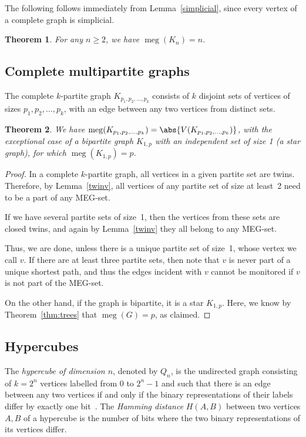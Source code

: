 \documentclass[10pt,a4paper]{article}
\newtheorem{theorem}{Theorem}[section]
\DeclareMathOperator{\MEG}{meg}
\begin{document}
The following follows immediately from Lemma~\ref{simplicial}, since every vertex of a complete graph is simplicial.

\begin{theorem}
 For any $n \geq 2$, we have $\MEG(K_n) = n$.
\end{theorem}

\subsection{Complete multipartite graphs}

The complete $k$-partite graph $K_{p_1,p_2,\ldots,p_k}$ consists of $k$ disjoint sets of vertices of sizes $p_1,p_2,\ldots,p_k$, with an edge between any two vertices from distinct sets.

\begin{theorem}
We have $\MEG(K_{p_1,p_2,\ldots,p_k}) = \abs{V(K_{p_1,p_2,\ldots,p_k})}$, with the exceptional case of a bipartite graph $K_{1,p}$ with an independent set of size 1 (a star graph), for which $\MEG(K_{1,p})=p$.
\end{theorem}
\begin{proof}
In a complete $k$-partite graph, all vertices in a given partite set are twins. Therefore, by Lemma~\ref{twinv}, all vertices of any partite set of size at least~2 need to be a part of any MEG-set.

If we have several partite sets of size~1, then the vertices from these sets are closed twins, and again by Lemma~\ref{twinv} they all belong to any MEG-set.

Thus, we are done, unless there is a unique partite set of size~1, whose vertex we call $v$. If there are at least three partite sets, then note that $v$ is never part of a unique shortest path, and thus the edges incident with $v$ cannot be monitored if $v$ is not part of the MEG-set.

On the other hand, if the graph is bipartite, it is a star $K_{1,p}$. Here, we know by Theorem~\ref{thm:trees} that $\MEG(G)=p$, as claimed.
\end{proof}

\subsection{Hypercubes}

The \emph{hypercube of dimension $n$}, denoted by $Q_n$, is the undirected graph consisting of $k = 2^n$ vertices labelled from $0$ to $2^n - 1$ and such that there is an edge between any two vertices if and only if the binary representations of their labels differ by exactly one bit~\cite{r8}. The \emph{Hamming distance} $H(A,B)$ between two vertices $A,B$ of a hypercube is the number of bits where the two binary representations of its vertices differ. 
\end{document}
